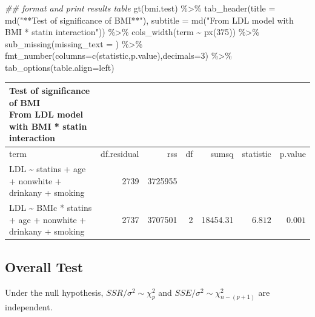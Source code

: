 \documentclass[
  letterpaper,
  DIV=11,
  numbers=noendperiod]{scrreport}
\newenvironment{Shaded}{\begin{snugshade}}{\end{snugshade}}
\newcommand{\AttributeTok}[1]{\textcolor[rgb]{0.40,0.45,0.13}{#1}}
\newcommand{\DecValTok}[1]{\textcolor[rgb]{0.68,0.00,0.00}{#1}}
\newcommand{\DocumentationTok}[1]{\textcolor[rgb]{0.37,0.37,0.37}{\textit{#1}}}
\newcommand{\FunctionTok}[1]{\textcolor[rgb]{0.28,0.35,0.67}{#1}}
\newcommand{\NormalTok}[1]{\textcolor[rgb]{0.00,0.23,0.31}{#1}}
\newcommand{\SpecialCharTok}[1]{\textcolor[rgb]{0.37,0.37,0.37}{#1}}
\newcommand{\StringTok}[1]{\textcolor[rgb]{0.13,0.47,0.30}{#1}}
\begin{document}
\begin{Shaded}
\begin{Highlighting}[]
\DocumentationTok{\#\# format and print results table }
\FunctionTok{gt}\NormalTok{(bmi.test) }\SpecialCharTok{\%\textgreater{}\%} 
  \FunctionTok{tab\_header}\NormalTok{(}\AttributeTok{title =} \FunctionTok{md}\NormalTok{(}\StringTok{"**Test of significance of BMI**"}\NormalTok{),}
             \AttributeTok{subtitle =} \FunctionTok{md}\NormalTok{(}\StringTok{"From LDL model with BMI * statin interaction"}\NormalTok{)) }\SpecialCharTok{\%\textgreater{}\%} 
  \FunctionTok{cols\_width}\NormalTok{(term }\SpecialCharTok{\textasciitilde{}} \FunctionTok{px}\NormalTok{(}\DecValTok{375}\NormalTok{)) }\SpecialCharTok{\%\textgreater{}\%} \FunctionTok{sub\_missing}\NormalTok{(}\AttributeTok{missing\_text =} \StringTok{\textquotesingle{}\textquotesingle{}}\NormalTok{) }\SpecialCharTok{\%\textgreater{}\%} 
  \FunctionTok{fmt\_number}\NormalTok{(}\AttributeTok{columns=}\FunctionTok{c}\NormalTok{(}\StringTok{\textquotesingle{}statistic\textquotesingle{}}\NormalTok{,}\StringTok{\textquotesingle{}p.value\textquotesingle{}}\NormalTok{),}\AttributeTok{decimals=}\DecValTok{3}\NormalTok{) }\SpecialCharTok{\%\textgreater{}\%} 
  \FunctionTok{tab\_options}\NormalTok{(}\AttributeTok{table.align=}\StringTok{\textquotesingle{}left\textquotesingle{}}\NormalTok{)}
\end{Highlighting}
\end{Shaded}

\begin{longtable}{lrrrrrr}
\caption*{
{\large \textbf{Test of significance of BMI}} \\ 
{\small From LDL model with BMI * statin interaction}
} \\ 
\toprule
term & df.residual & rss & df & sumsq & statistic & p.value \\ 
\midrule
LDL \textasciitilde{} statins + age + nonwhite + drinkany + smoking & 2739 & 3725955 &  &  &  &  \\ 
LDL \textasciitilde{} BMIc * statins + age + nonwhite + drinkany + smoking & 2737 & 3707501 & 2 & 18454.31 & $6.812$ & $0.001$ \\ 
\bottomrule
\end{longtable}

\hypertarget{overall-test}{%
\subsection{Overall Test}\label{overall-test}}

Under the null hypothesis, \(SSR/\sigma^2 \sim \chi^2_p\) and
\(SSE/\sigma^2 \sim \chi^2_{n-(p+1)}\) are independent.
\end{document}
